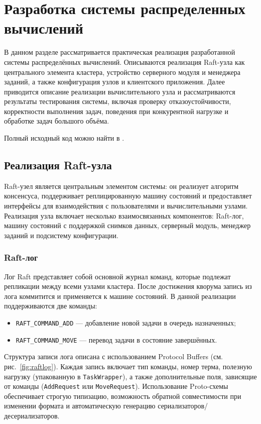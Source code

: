 \section{Разработка системы распределенных вычислений}

В данном разделе рассматривается практическая реализация
разработанной системы распределённых вычислений. Описываются
реализация Raft-узла как центрального элемента кластера, устройство
серверного модуля и менеджера заданий, а также конфигурация узлов и
клиентского приложения. Далее приводится описание реализации
вычислительного узла и рассматриваются результаты тестирования
системы, включая проверку отказоустойчивости, корректности
выполнения задач, поведения при конкурентной нагрузке и обработке
задач большого объёма.

Полный исходный код можно найти в \cite{abeille}.

\subsection{Реализация Raft-узла}

Raft-узел является центральным элементом системы: он реализует алгоритм
консенсуса, поддерживает реплицированную машину состояний и предоставляет
интерфейсы для взаимодействия с пользователями и вычислительными узлами.
Реализация узла включает несколько взаимосвязанных компонентов: Raft-лог,
машину состояний с поддержкой снимков данных, серверный модуль, менеджер
заданий и подсистему конфигурации.

\subsubsection{Raft-лог}

Лог Raft представляет собой основной журнал команд, которые подлежат
репликации между всеми узлами кластера. После достижения кворума
запись из лога коммитится и применяется к машине состояний.
В данной реализации поддерживаются две команды:

\begin{itemize}
    \item \texttt{RAFT\_COMMAND\_ADD} — добавление новой задачи в очередь назначенных;
    \item \texttt{RAFT\_COMMAND\_MOVE} — перевод задачи в состояние завершённых.
\end{itemize}

Структура записи лога описана с использованием Protocol Buffers
(см. рис.~\ref{fig:raftlog}). Каждая запись включает тип команды,
номер терма, полезную нагрузку (упакованную в \texttt{TaskWrapper}),
а также дополнительные поля, зависящие от команды
(\texttt{AddRequest} или \texttt{MoveRequest}).
Использование Proto-схемы обеспечивает строгую типизацию,
возможность обратной совместимости при изменении формата и
автоматическую генерацию сериализаторов/десериализаторов.

